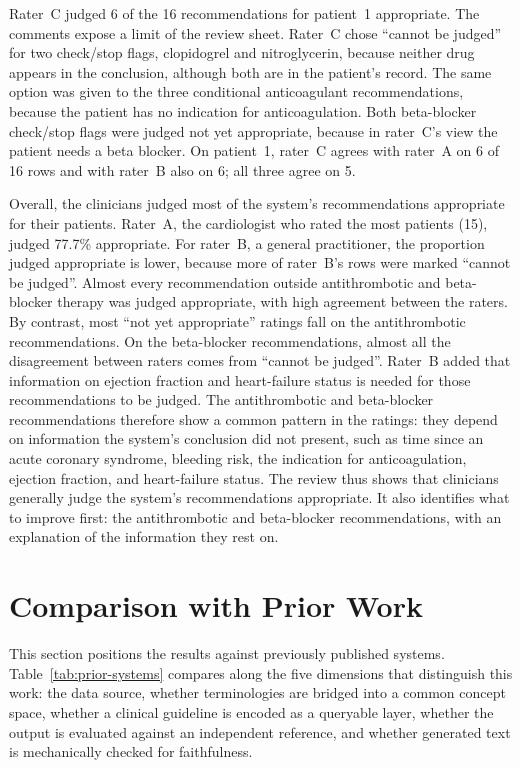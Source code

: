 Rater~C judged 6 of the 16 recommendations for patient~1 appropriate. The comments expose a
limit of the review sheet. Rater~C chose ``cannot be judged'' for two check/stop flags,
clopidogrel and nitroglycerin, because neither drug appears in the conclusion, although both
are in the patient's record. The same option was given to the three conditional
anticoagulant recommendations, because the patient has no indication for anticoagulation.
Both beta-blocker check/stop flags were judged not yet appropriate, because in rater~C's view
the patient needs a beta blocker. On patient~1, rater~C agrees with rater~A on 6 of 16 rows
and with rater~B also on 6; all three agree on 5.

Overall, the clinicians judged most of the system's recommendations appropriate for their
patients. Rater~A, the cardiologist who rated the most patients (15), judged 77.7\%
appropriate. For rater~B, a general practitioner, the proportion judged appropriate is lower,
because more of rater~B's rows were marked ``cannot be judged''. Almost every recommendation
outside antithrombotic and beta-blocker therapy was judged appropriate, with high agreement
between the raters. By contrast, most ``not yet appropriate'' ratings fall on the
antithrombotic recommendations. On the beta-blocker recommendations, almost all the
disagreement between raters comes from ``cannot be judged''. Rater~B added that information
on ejection fraction and heart-failure status is needed for those recommendations to be
judged. The antithrombotic and beta-blocker recommendations therefore show a common pattern
in the ratings: they depend on information the system's conclusion did not present, such as
time since an acute coronary syndrome, bleeding risk, the indication for anticoagulation,
ejection fraction, and heart-failure status. The review thus shows that clinicians generally
judge the system's recommendations appropriate. It also identifies what to improve first: the
antithrombotic and beta-blocker recommendations, with an explanation of the information they
rest on.

\section{Comparison with Prior Work}
\label{sec:prior-work}

This section positions the results against previously published systems.
Table~\ref{tab:prior-systems} compares along the five dimensions that distinguish this
work: the data source, whether terminologies are bridged into a common concept space,
whether a clinical guideline is encoded as a queryable layer, whether the output is
evaluated against an independent reference, and whether generated text is mechanically
checked for faithfulness.

